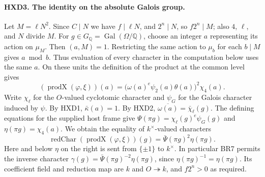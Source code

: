 \paragraph{HXD3. The identity on the absolute Galois group.}
Let $M=\ell N^2$. Since $C\mid N$ we have $f\mid\ell N$, and
$2^n\mid N$, so $f2^n\mid M$; also $4$, $\ell$, and $N$ divide $M$.
For $g\in G_{\mathbb Q}=\operatorname{Gal}(\Omega/\mathbb Q)$,
choose an integer $a$ representing its action on $\mu_M$. Then
$(a,M)=1$. Restricting the same action to $\mu_b$ for each $b\mid M$
gives $a\bmod b$. Thus evaluation of every character in the computation
below uses the same $a$. On these units the definition of the product
at the common level gives
\[
  (\operatorname{prodX}(\varphi,\xi))(a)=
        \big(\omega(a)^e\psi_2(a)\theta(a)\big)^2\chi_4(a).
\]
Write $\chi_\ell$ for the $O$-valued cyclotomic character and
$\psi_G$ for the Galois character induced by $\psi$.
By HXD1, $\bar\kappa(a)=1$. By HXD2,
$\overline{\omega(a)}=\bar\chi_\ell(g)$. The defining equations
for the supplied host frame give
$\Psi(\pi g)=\chi_\ell(g)^e\psi_G(g)$ and
$\eta(\pi g)=\chi_4(a)$. We obtain the equality of $k^\times$-valued
characters
\[
   \operatorname{redChar}(\operatorname{prodX}(\varphi,\xi))(g)
     =\bar\Psi(\pi g)^2\eta(\pi g).
\]
Here and below $\eta$ on the right is sent from $\{\pm1\}$ to
$k^\times$. In particular BR7 permits the inverse character
$\gamma(g)=\bar\Psi(\pi g)^{-2}\eta(\pi g)$, since
$\eta(\pi g)^{-1}=\eta(\pi g)$. Its coefficient field and reduction
map are $k$ and $O\twoheadrightarrow k$, and $f2^n>0$ as required.
